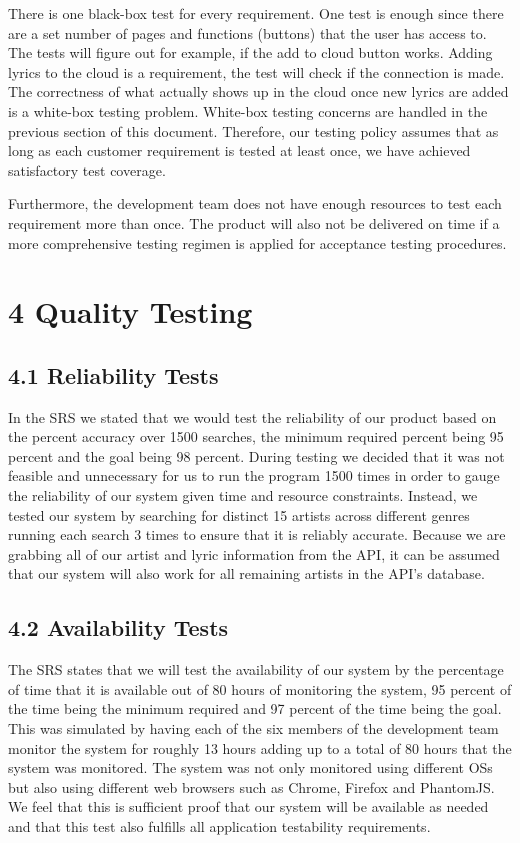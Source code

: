 \documentclass[]{article}
\begin{document}
There is one black-box test for every requirement. One test is enough
since there are a set number of pages and functions (buttons) that the
user has access to. The tests will figure out for example, if the add to
cloud button works. Adding lyrics to the cloud is a requirement, the
test will check if the connection is made. The correctness of what
actually shows up in the cloud once new lyrics are added is a white-box
testing problem. White-box testing concerns are handled in the previous
section of this document. Therefore, our testing policy assumes that as
long as each customer requirement is tested at least once, we have
achieved satisfactory test coverage.

Furthermore, the development team does not have enough resources to test
each requirement more than once. The product will also not be delivered
on time if a more comprehensive testing regimen is applied for
acceptance testing procedures.

\section{\textbf{4 Quality Testing}}\label{quality-testing}

\subsection{\textbf{4.1 Reliability Tests}}\label{reliability-tests}

In the SRS we stated that we would test the reliability of our product
based on the percent accuracy over 1500 searches, the minimum required
percent being 95 percent and the goal being 98 percent. During testing
we decided that it was not feasible and unnecessary for us to run the
program 1500 times in order to gauge the reliability of our system given
time and resource constraints. Instead, we tested our system by
searching for distinct 15 artists across different genres running each
search 3 times to ensure that it is reliably accurate. Because we are
grabbing all of our artist and lyric information from the API, it can be
assumed that our system will also work for all remaining artists in the
API's database.

\subsection{\textbf{4.2 Availability Tests}}\label{availability-tests}

The SRS states that we will test the availability of our system by the
percentage of time that it is available out of 80 hours of monitoring
the system, 95 percent of the time being the minimum required and 97
percent of the time being the goal. This was simulated by having each of
the six members of the development team monitor the system for roughly
13 hours adding up to a total of 80 hours that the system was monitored.
The system was not only monitored using different OSs but also using
different web browsers such as Chrome, Firefox and PhantomJS. We feel
that this is sufficient proof that our system will be available as
needed and that this test also fulfills all application testability
requirements.
\end{document}
